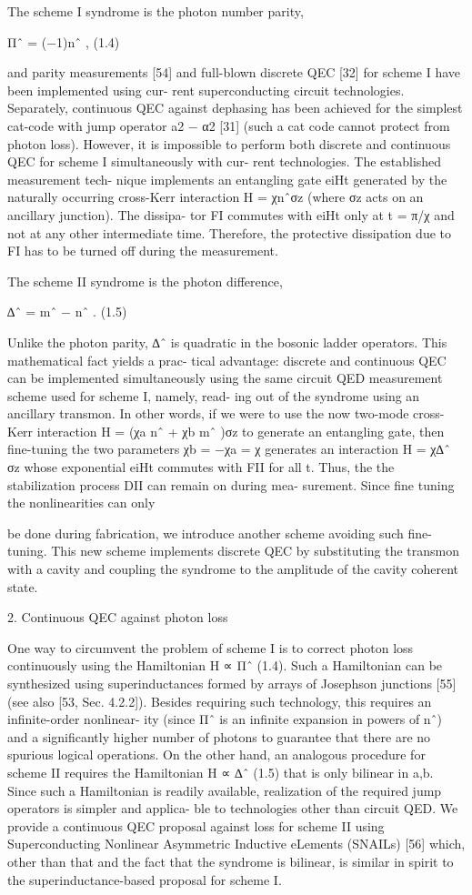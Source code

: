 \documentclass[12]{amsart}
\newcommand\0{\mathbf{0}}
\newcommand\<{\langle}
\renewcommand\>{\rangle}
\begin{document}
The scheme I syndrome is the photon number parity,

Πˆ = (−1)nˆ , (1.4)

and parity measurements [54] and full-blown discrete QEC [32] for scheme I have been implemented using cur- rent superconducting circuit technologies. Separately, continuous QEC against dephasing has been achieved for the simplest cat-code with jump operator a2 − α2 [31] (such a cat code cannot protect from photon loss). However, it is impossible to perform both discrete and continuous QEC for scheme I simultaneously with cur- rent technologies. The established measurement tech- nique implements an entangling gate eiHt generated by the naturally occurring cross-Kerr interaction H = χnˆσz (where σz acts on an ancillary junction). The dissipa- tor FI commutes with eiHt only at t = π/χ and not at any other intermediate time. Therefore, the protective dissipation due to FI has to be turned off during the measurement.

The scheme II syndrome is the photon difference,

∆ˆ = mˆ − nˆ . (1.5)

Unlike the photon parity, ∆ˆ is quadratic in the bosonic ladder operators. This mathematical fact yields a prac- tical advantage: discrete and continuous QEC can be implemented simultaneously using the same circuit QED measurement scheme used for scheme I, namely, read- ing out of the syndrome using an ancillary transmon. In other words, if we were to use the now two-mode cross-Kerr interaction H = (χa nˆ + χb mˆ )σz to generate an entangling gate, then fine-tuning the two parameters χb = −χa = χ generates an interaction H = χ∆ˆ σz whose exponential eiHt commutes with FII for all t. Thus, the the stabilization process DII can remain on during mea- surement. Since fine tuning the nonlinearities can only

be done during fabrication, we introduce another scheme avoiding such fine-tuning. This new scheme implements discrete QEC by substituting the transmon with a cavity and coupling the syndrome to the amplitude of the cavity coherent state.

2. Continuous QEC against photon loss

One way to circumvent the problem of scheme I is to correct photon loss continuously using the Hamiltonian H ∝ Πˆ (1.4). Such a Hamiltonian can be synthesized using superinductances formed by arrays of Josephson junctions [55] (see also [53, Sec. 4.2.2]). Besides requiring such technology, this requires an infinite-order nonlinear- ity (since Πˆ is an infinite expansion in powers of nˆ) and a significantly higher number of photons to guarantee that there are no spurious logical operations. On the other hand, an analogous procedure for scheme II requires the Hamiltonian H ∝ ∆ˆ (1.5) that is only bilinear in a,b. Since such a Hamiltonian is readily available, realization of the required jump operators is simpler and applica- ble to technologies other than circuit QED. We provide a continuous QEC proposal against loss for scheme II using Superconducting Nonlinear Asymmetric Inductive eLements (SNAILs) [56] which, other than that and the fact that the syndrome is bilinear, is similar in spirit to the superinductance-based proposal for scheme I.
\end{document}
